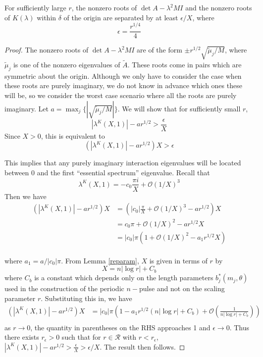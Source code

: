 \documentclass[thesis.tex]{subfiles}
\begin{document}
\begin{lemma}\label{epsilonballslemma}
For sufficiently large $r$, the nonzero roots of $\det A - \lambda^2 M I$ and the nonzero roots of $K(\lambda)$ within $\delta$ of the origin are separated by at least $\epsilon/X$, where
\begin{equation}\label{epsilonchoice}
\epsilon = \frac{r^{1/4}}{4}
\end{equation}
\begin{proof}
The nonzero roots of $\det A - \lambda^2 M I$ are of the form $\pm r^{1/2} \sqrt{\tilde{\mu}_j/M}$, where $\tilde{\mu}_j$ is one of the nonzero eigenvalues of $\tilde{A}$. These roots come in pairs which are symmetric about the origin. Although we only have to consider the case when these roots are purely imaginary, we do not know in advance which ones these will be, so we consider the worst case scenario where all the roots are purely imaginary. Let $a = \max_j\{| \sqrt{\tilde{\mu}_j/M}|\}$. We will show that for sufficiently small $r$, 
\[
|\lambda^K(X,1)| - a r^{1/2} > \frac{\epsilon}{X}
\]
Since $X > 0$, this is equivalent to
\[
(|\lambda^K(X,1)| - a r^{1/2})X  > \epsilon
\]

This implies that any purely imaginary interaction eigenvalues will be located between 0 and the first ``essential spectrum'' eigenvalue. Recall that 
\[
\lambda^K(X,1)
= -c_0 \frac{\pi i }{X} + \mathcal{O}(1/X)^3 
\]
Then we have
\begin{align*}
(|\lambda^K(X,1)| - a r^{1/2})X &= \left( |c_0| \frac{\pi}{X} + \mathcal{O}(1/X)^3 - a r^{1/2} \right)X \\
&= c_0 \pi + \mathcal{O}(1/X)^2 - a r^{1/2} X \\
&= |c_0| \pi \left(1 + \mathcal{O}(1/X)^2 - a_1 r^{1/2} X\right)  \\
\end{align*}

where $a_1 = a / |c_0| \pi$. From Lemma \ref{reparam}, $X$ is given in terms of $r$ by
\[
X = n |\log r| + C_b
\]
where $C_b$ is a constant which depends only on the length parameters $b^*_j(m_j, \theta)$ used in the construction of the periodic $n-$pulse and not on the scaling parameter $r$. Substituting this in, we have
\begin{align*}
(|\lambda^K(X,1)| - a r^{1/2})X 
&= |c_0| \pi \left(1 - a_1 r^{1/2}(n |\log r| + C_b) + \mathcal{O}\left( \frac{1}{n |\log r| + C_b} \right) \right)  \\
\end{align*}
as $r \rightarrow 0$, the quantity in parentheses on the RHS approaches 1 and $\epsilon \rightarrow 0$. Thus there exists $r_\epsilon > 0$ such that for $r \in \mathcal{R}$ with $r < r_\epsilon$, $|\lambda^K(X,1)| - a r^{1/2} > \frac{\epsilon}{X} > \epsilon/X$. The result then follows.
\end{proof}
\end{lemma}
\end{document}
